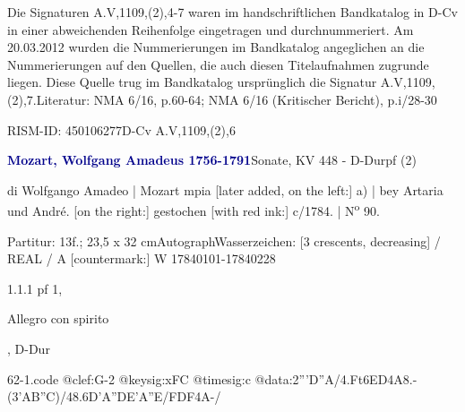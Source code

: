 \documentclass[a4paper, twocolumn, 11pt]{book}
\begin{document}
\newline %
\par Die Signaturen A.V,1109,(2),4-7 waren im handschriftlichen Bandkatalog in D-Cv in einer abweichenden Reihenfolge eingetragen und durchnummeriert. Am 20.03.2012 wurden die Nummerierungen im Bandkatalog angeglichen an die Nummerierungen auf den Quellen, die auch diesen Titelaufnahmen zugrunde liegen. Diese Quelle trug im Bandkatalog ursprünglich die Signatur A.V,1109,(2),7.\newline Literatur: NMA  6/16, p.60-64; NMA  6/16 (Kritischer Bericht), p.i/28-30
\par RISM-ID: 450106277\newline D-Cv  A.V,1109,(2),6
\par \vspace{16pt} \textcolor{darkblue}{\textbf{Mozart, Wolfgang Amadeus  1756-1791}}\hfillplus{[62]}\newline Sonate, KV 448 - D-Dur\newline pf (2)
\par \begin{itshape} di Wolfgango Amadeo | Mozart mpia [later added, on the left:] a) | bey Artaria und André. [on the right:] gestochen [with red ink:] c/1784. | N\textsuperscript{o} 90.\end{itshape} 
\par \textcolor{darkblue}{}  Partitur: 13f.; 23,5 x 32 cm\newline Autograph\newline Wasserzeichen: [3 crescents, decreasing] / REAL / A [countermark:] W  17840101-17840228
\par 1.1.1  pf 1, \begin{itshape}Allegro con spirito\end{itshape}, D-Dur  
\begin{filecontents*}{62-1.code}
@clef:G-2
@keysig:xFC
@timesig:c
@data:2'''D''A/4.Ft{6ED}4A8.-(3{'AB''C})/48.6D'{A''D}E{'A''E}/F{DF}4A-/
\end{filecontents*}
\end{document}
